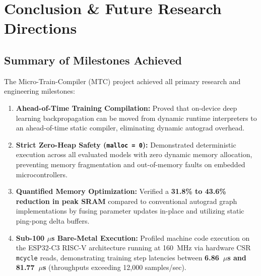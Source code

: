\documentclass[12pt,a4paper]{report}
\begin{document}
\chapter{Conclusion \& Future Research Directions}

\section{Summary of Milestones Achieved}
The Micro-Train-Compiler (MTC) project achieved all primary research and engineering milestones:
\begin{enumerate}
    \item \textbf{Ahead-of-Time Training Compilation:} Proved that on-device deep learning backpropagation can be moved from dynamic runtime interpreters to an ahead-of-time static compiler, eliminating dynamic autograd overhead.
    \item \textbf{Strict Zero-Heap Safety (\texttt{malloc = 0}):} Demonstrated deterministic execution across all evaluated models with zero dynamic memory allocation, preventing memory fragmentation and out-of-memory faults on embedded microcontrollers.
    \item \textbf{Quantified Memory Optimization:} Verified a \textbf{31.8\% to 43.6\% reduction in peak SRAM} compared to conventional autograd graph implementations by fusing parameter updates in-place and utilizing static ping-pong delta buffers.
    \item \textbf{Sub-100 $\mu$s Bare-Metal Execution:} Profiled machine code execution on the ESP32-C3 RISC-V architecture running at 160~MHz via hardware CSR \texttt{mcycle} reads, demonstrating training step latencies between \textbf{6.86~$\mu$s and 81.77~$\mu$s} (throughputs exceeding 12,000 samples/sec).
\end{enumerate}
\end{document}
